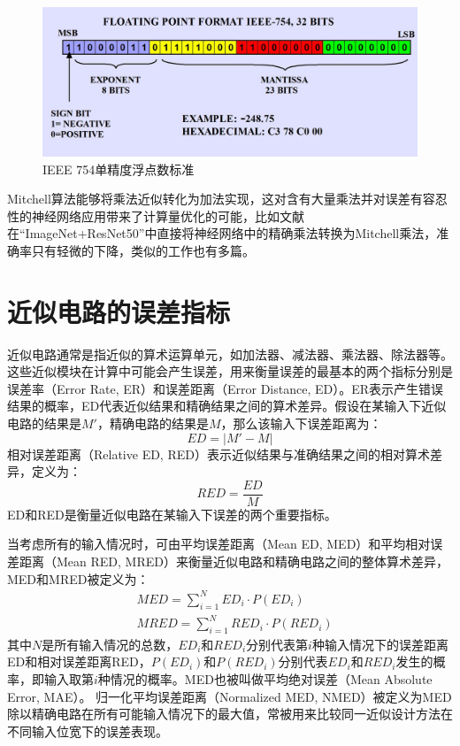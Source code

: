 \begin{figure}[!htb]
    \centering
    \includegraphics[width=0.8\linewidth]{figs/EM-mitchell_IEEE754.jpg}
    \caption{IEEE 754单精度浮点数标准}
    \label{EM:Fig:mitchell_IEEE754}
\end{figure}

Mitchell算法能够将乘法近似转化为加法实现，这对含有大量乘法并对误差有容忍性的神经网络应用带来了计算量优化的可能，比如文献\cite{DNN:mitchell_Training}在“ImageNet+ResNet50”中直接将神经网络中的精确乘法转换为Mitchell乘法，准确率只有轻微的下降，类似的工作也有多篇\cite{AC:AM:mitchell_aspdac2018,AC:AM:mitchell_tc2019}。

\section{近似电路的误差指标} \label{近似电路的误差指标}

近似电路通常是指近似的算术运算单元，如加法器、减法器、乘法器、除法器等。这些近似模块在计算中可能会产生误差，用来衡量误差的最基本的两个指标分别是误差率（Error Rate, ER）和误差距离（Error Distance, ED）\cite{AC:Arith:survey_hanjie}。ER表示产生错误结果的概率，ED代表近似结果和精确结果之间的算术差异。假设在某输入下近似电路的结果是$M \prime$，精确电路的结果是$M$，那么该输入下误差距离为：
\begin{equation}
    ED = | M′−M |
\label{AC:Arith:ED}
\end{equation}
相对误差距离（Relative ED, RED）表示近似结果与准确结果之间的相对算术差异，定义为：
\begin{equation}
    RED = \dfrac{ED}{M}
\label{AC:Arith:RED}
\end{equation}
ED和RED是衡量近似电路在某输入下误差的两个重要指标。

当考虑所有的输入情况时，可由平均误差距离（Mean ED, MED）和平均相对误差距离（Mean RED, MRED）来衡量近似电路和精确电路之间的整体算术差异，MED和MRED被定义为：
\begin{align}
    & MED = \sum _{i=1}^{N} ED_{i} \cdot P(ED_{i}) \label{AC:Arith:MED} \\
    & MRED = \sum _{i=1}^{N} RED_{i} \cdot P(RED_{i}) \label{AC:Arith:MRED}
\end{align}
其中$N$是所有输入情况的总数，$ED_{i}$和$RED_{i}$分别代表第$i$种输入情况下的误差距离ED和相对误差距离RED，$P(ED_{i})$和$P(RED_{i})$分别代表$ED_{i}$和$RED_{i}$发生的概率，即输入取第$i$种情况的概率。MED也被叫做平均绝对误差（Mean Absolute Error, MAE）。
归一化平均误差距离（Normalized MED, NMED）被定义为MED除以精确电路在所有可能输入情况下的最大值，常被用来比较同一近似设计方法在不同输入位宽下的误差表现。

